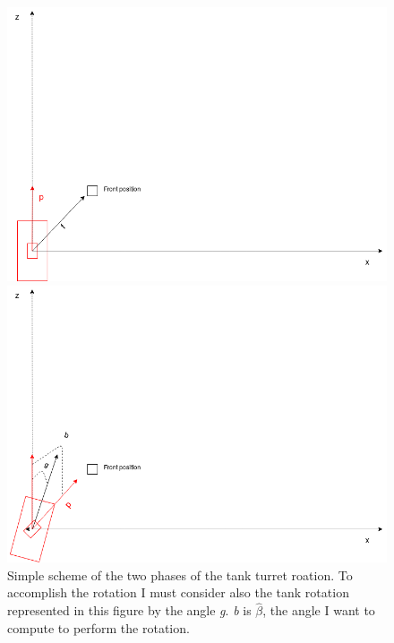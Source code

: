 \documentclass[14pt]{article}
\begin{document}
\begin{figure}[H]
\begin{minipage}[t]{0.77\textwidth}
\center
\includegraphics[width=\textwidth]{diagrams/turretChart.png}
\end{minipage}
\hfill
\begin{minipage}[t]{0.77\textwidth}
\center
\includegraphics[width=\textwidth]{diagrams/turretChartRot.png}
\end{minipage}
\caption{Simple scheme of the two phases of the tank turret roation. To accomplish the rotation I must consider also the tank rotation represented in this figure by the angle \textit{g}. \textit{b} is \(\hat{\beta}\), the angle I want to compute to perform the rotation.}
\label{img:turretChartOrientation}
\end{figure}
\end{document}
